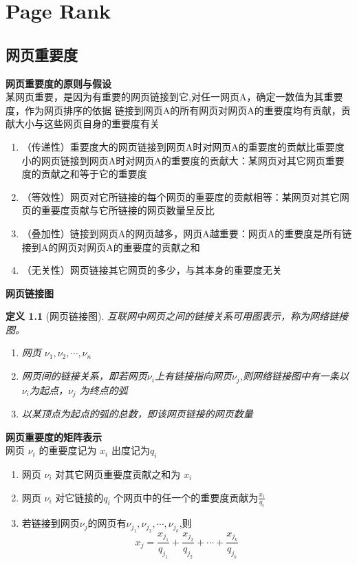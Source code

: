\documentclass[12pt, a4paper, oneside]{ctexbook}
\newtheorem{definition}[theorem]{定义}
\begin{document}
\newpage
\chapter{Page Rank}
\section{网页重要度}
\noindent\textbf{网页重要度的原则与假设}\\
某网页重要，是因为有重要的网页链接到它,对任一网页A，确定一数值为其重要度，作为网页排序的依据
链接到网页A的所有网页对网页A的重要度均有贡献，贡献大小与这些网页自身的重要度有关
\begin{enumerate}	
    \item （传递性）重要度大的网页链接到网页A时对网页A的重要度的贡献比重要度小的网页链接到网页A时对网页A的重要度的贡献大：某网页对其它网页重要度的贡献之和等于它的重要度
    \item （等效性）网页对它所链接的每个网页的重要度的贡献相等：某网页对其它网页的重要度贡献与它所链接的网页数量呈反比
    \item （叠加性）链接到网页A的网页越多，网页A越重要：网页A的重要度是所有链接到A的网页对网页A的重要度的贡献之和
    \item （无关性）网页链接其它网页的多少，与其本身的重要度无关
\end{enumerate}	
\noindent\textbf{网页链接图}
\begin{definition}[网页链接图]
    互联网中网页之间的链接关系可用图表示，称为网络链接图。
    \begin{enumerate}
        \item[顶点]网页 $\nu_1,\nu_2,\cdots,\nu_n$ 
        \item[弧]网页间的链接关系，即若网页$\nu_i$上有链接指向网页$\nu_j$,则网络链接图中有一条以$\nu_i$为起点，$\nu_j$ 为终点的弧
        \item[出度]以某顶点为起点的弧的总数，即该网页链接的网页数量
    \end{enumerate}    
\end{definition}
\noindent\textbf{网页重要度的矩阵表示}\\
网页 $\nu_i$ 的重要度记为 $x_i$ 出度记为$q_i$
\begin{enumerate}
    \item[传递性]网页 $\nu_i$ 对其它网页重要度贡献之和为 $x_i$
    \item[等效性]网页 $\nu_i$ 对它链接的$q_i$ 个网页中的任一个的重要度贡献为$\frac{x_i}{q_i}$
    \item[叠加性]若链接到网页$\nu_j$的网页有$\nu_{j_1},\nu_{j_2},\cdots,\nu_{j_k}$,则
        $$x_j=\frac{x_{j_1}}{q_{j_1}}+\frac{x_{j_2}}{q_{j_2}}+\cdots+\frac{x_{j_k}}{q_{j_k}}$$
\end{enumerate} 
\end{document}
